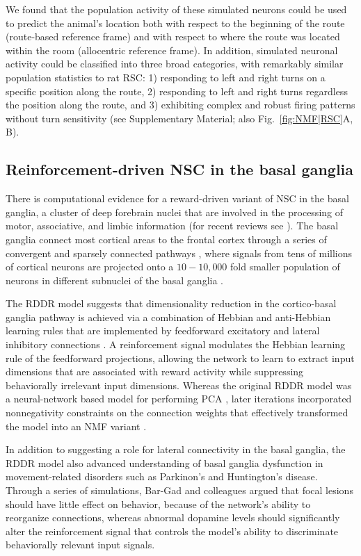 We found that the population activity of these simulated neurons could be used to predict
the animal's location both with respect to the beginning of the route
(route-based reference frame)
and with respect to where the route was located within the room
(allocentric reference frame).
In addition, simulated neuronal activity could be classified into three broad categories,
with remarkably similar population statistics to rat \ac{RSC}:
1) responding to left and right turns on a specific position along the route,
2) responding to left and right turns regardless the position along the route,
and 3) exhibiting complex and robust firing patterns without turn sensitivity
(see Supplementary Material; also Fig.~\ref{fig:NMF|RSC}A, B).


\subsection*{Reinforcement-driven NSC in the basal ganglia}

There is computational evidence 
for a reward-driven variant of \ac{NSC} in the basal ganglia, 
a cluster of deep forebrain nuclei that are involved in the 
processing of motor, associative, and limbic information
(for recent reviews see \cite{BarGad2003_Review,NelsonKreitzer2014}).
The basal ganglia connect most cortical areas to the frontal cortex through
a series of convergent and sparsely connected pathways \cite{schwab2015},
where signals from tens of millions of cortical neurons are projected
onto a $10 - 10,000$ fold smaller population of neurons in different subnuclei
of the basal ganglia \cite{BarGad2003_Review}.

The \ac{RDDR} model suggests that dimensionality reduction 
in the cortico-basal ganglia pathway is achieved via
a combination of Hebbian and anti-Hebbian learning rules
that are implemented by feedforward excitatory and lateral inhibitory
connections \cite{BarGad2000,BarGad2003_Review}.
A reinforcement signal modulates the Hebbian learning rule 
of the feedforward projections,
allowing the network to learn to extract input dimensions
that are associated with reward activity
while suppressing behaviorally irrelevant input dimensions.
Whereas the original \ac{RDDR} model was a neural-network based model
for performing \ac{PCA} \cite{BarGad2000},
later iterations incorporated nonnegativity constraints on the
connection weights that effectively transformed the model 
into an \ac{NMF} variant \cite{BarGad2003_Review}.

In addition to suggesting a role for lateral connectivity
in the basal ganglia,
the \ac{RDDR} model also advanced understanding of basal ganglia dysfunction
in movement-related disorders such as Parkinon's and Huntington's disease.
Through a series of simulations, Bar-Gad and colleagues \cite{BarGad2003_Review}
argued that focal lesions should have little effect on behavior,
because of the network's ability to reorganize connections,
whereas abnormal dopamine levels should significantly alter 
the reinforcement signal that controls the model's ability 
to discriminate behaviorally relevant input signals.


